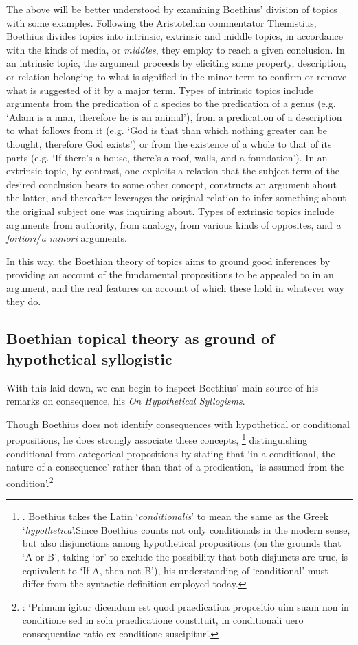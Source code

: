 \documentclass[a4paper, 11pt]{article}
\begin{document}
The above will be better understood by examining Boethius' division of topics with some examples. Following the Aristotelian commentator Themistius, Boethius divides topics into intrinsic, extrinsic and middle topics, in accordance with the kinds of media, or \emph{middles}, they employ to reach a given conclusion. In an intrinsic topic, the argument proceeds by eliciting some property, description, or relation belonging to what is signified in the minor term to confirm or remove what is suggested of it by a major term. Types of intrinsic topics include arguments from the predication of a species to the predication of a genus (e.g. `Adam is a man, therefore he is an animal'), from a predication of a description to what follows from it (e.g. `God is that than which nothing greater can be thought, therefore God exists') or from the existence of a whole to that of its parts (e.g. `If there's a house, there's a roof, walls, and a foundation'). In an extrinsic topic, by contrast, one exploits a relation that the subject term of the desired conclusion bears to some other concept, constructs an argument about the latter, and thereafter leverages the original relation to infer something about the original subject one was inquiring about. Types of extrinsic topics include arguments from authority, from analogy, from various kinds of opposites, and \emph{a fortiori}/\emph{a minori} arguments. 

In this way, the Boethian theory of topics aims to ground good inferences by providing an account of the fundamental propositions to be appealed to in an argument, and the real features on account of which these hold in whatever way they do.

\subsection{Boethian topical theory as ground of hypothetical syllogistic}
With this laid down, we can begin to inspect Boethius' main source of his remarks on consequence, his \emph{On Hypothetical Syllogisms}. 

Though Boethius does not identify consequences with hypothetical or conditional propositions, he does strongly associate these concepts, \footnote{\autocite[1.3.2]{BHS}. Boethius takes the Latin `\emph{conditionalis}' to mean the same as the Greek `\emph{hypothetica}'.Since Boethius counts not only conditionals in the modern sense, but also disjunctions among hypothetical propositions (on the grounds that `A or B', taking `or' to exclude the possibility that both disjuncts are true, is equivalent to `If A, then not B'), his understanding of `conditional' must differ from the syntactic definition employed today.} distinguishing conditional from categorical propositions by stating that `in a conditional, the nature of a consequence' rather than that of a predication, `is assumed from the condition'.\footnote{\autocite[1.1.6]{BHS}: `Primum igitur dicendum est quod praedicatiua propositio uim suam non in conditione sed in sola praedicatione constituit, in conditionali uero consequentiae ratio ex conditione suscipitur'.} 
\end{document}
